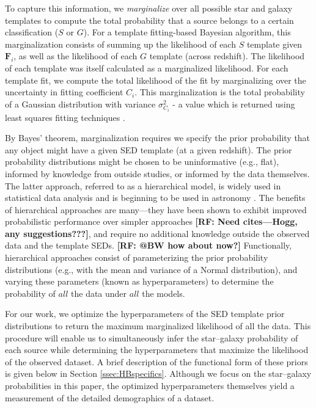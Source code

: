 \documentclass[12pt,preprint]{aastex}
\newcommand{\datavector}[1]{\boldsymbol{#1}}
\newcommand\rf[1]{{\bf [RF: #1]}}
\begin{document}

To capture this information, we \textit{marginalize} over all possible
star and galaxy templates to compute the total probability that a
source belongs to a certain classification ($S$ or $G$).  For a
template fitting-based Bayesian algorithm, this marginalization
consists of summing up the likelihood of each $S$ template given
$\datavector{F}_i$, as well as the likelihood of each $G$ template
(across redshift).  The likelihood of each template was itself
calculated as a marginalized likelihood.  For each template fit, we
compute the total likelihood of the fit by marginalizing over the
uncertainty in fitting coefficient $C_i$.  This marginalization is the
total probability of a Gaussian distribution with variance
$\sigma_{C_i}^2$ - a value which is returned using least squares
fitting techniques \citep[e.g.,][]{hogg10}.

By Bayes' theorem, marginalization requires we specify the prior
probability that any object might have a given SED template (at a
given redshift).  The prior probability distributions might be chosen
to be uninformative (e.g., flat), informed by knowledge from outside
studies, or informed by the data themselves.  The latter approach,
referred to as a hierarchical model, is widely used in statistical
data analysis \citep[e.g.,][]{gelman03} and is beginning to be used in
astronomy \citep{shu12}.  The benefits of hierarchical approaches are
many---they have been shown to exhibit improved probabilistic performance
over simpler approaches \rf{Need cites---Hogg, any suggestions???}, and require no additional
knowledge outside the observed data and the template SEDs.  \rf{@BW how about 
now?} Functionally,
hierarchical approaches consist of parameterizing the prior
probability distributions (e.g., with the mean and variance of a
Normal distribution), and varying these parameters (known as
hyperparameters) to determine the probability of $all$ the data under
$all$ the models.

For our work, we optimize the hyperparameters of the SED template
prior distributions to return the maximum marginalized likelihood of
all the data.  This procedure will enable us to simultaneously infer
the star--galaxy probability of each source while determining the
hyperparameters that maximize the likelihood of the observed dataset.
A brief description of the functional form of these priors is given
below in Section \ref{ssec:HBspecifics}.  Although we focus on the
star--galaxy probabilities in this paper, the optimized hyperparameters
themselves yield a measurement of the detailed demographics of a
dataset. 
\end{document}
